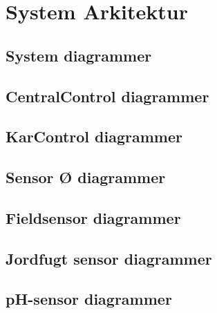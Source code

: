 
\chapter{System Arkitektur}


\section{System diagrammer}



\newpage
\section{CentralControl diagrammer}


\newpage
\section{KarControl diagrammer}


\newpage
\section{Sensor Ø diagrammer}


\newpage
\section{Fieldsensor diagrammer}


\newpage
\section{Jordfugt sensor diagrammer}


\newpage
\section{pH-sensor diagrammer}


